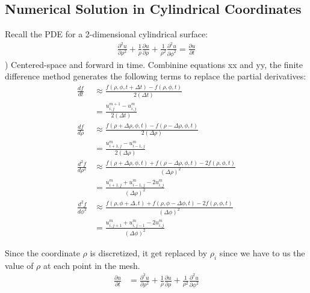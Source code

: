 \documentclass[11pt]{article}
\begin{document}
    \hypertarget{numerical-solution-in-cylindrical-coordinates}{%
\subsection{Numerical Solution in Cylindrical
Coordinates}\label{numerical-solution-in-cylindrical-coordinates}}

    Recall the PDE for a 2-dimensional cylindrical surface: \begin{equation}
\begin{split}
\frac {\partial^2 u}{\partial \rho^2} + \frac{1}{\rho} \frac {\partial u}{\partial \rho} + 
\frac{1}{\rho^2} \frac {\partial^2 u}{\partial \phi^2} = \frac {\partial u}{\partial t}
\end{split}
\end{equation}) Centered-space and forward in time. Combinine equations
xx and yy, the finite difference method generates the following terms to
replace the partial derivatives: \begin{equation}
\begin{split} 
\frac{df}{dt} &\approx \frac{f(\rho, \phi, t + \Delta t) - f(\rho, \phi, t)}{2 (\Delta t)} \\
&= \frac{u_{i,j}^{m + 1} - u_{i,j}^{m}}{2 (\Delta t)} \\
\frac{df}{d\rho} &\approx \frac{f(\rho +\Delta \rho, \phi, t) - f(\rho - \Delta \rho, \phi, t )}{2 (\Delta \rho)} \\
&= \frac{u_{i + 1,j}^{m} - u_{i -1 ,j}^{m}}{2 (\Delta \rho)} \\
\frac{d^2f}{d\rho^2} &\approx \frac{f(\rho + \Delta \rho, \phi, t) + f(\rho - \Delta \rho, \phi, t) - 2 f(\rho, \phi, t)}{(\Delta \rho)^2} \\
&= \frac{u_{i + 1 ,j}^m + u_{i - 1 ,j}^m - 2 u_{i,j}^m}{(\Delta \rho)^2} \\
\frac{d^2f}{d\phi^2} &\approx \frac{f(\rho, \phi + \Delta, t) + f(\rho, \phi - \Delta \phi, t) - 2 f(\rho, \phi, t)}{(\Delta \phi)^2} \\
&= \frac{u_{i,j + 1}^m + u_{i,j - 1}^m - 2 u_{i,j}^m}{(\Delta \phi)^2}  
\end{split} 
\end{equation}

Since the coordinate \(\rho\) is discretized, it get replaced by
\(\rho_i\) since we have to us the value of \(\rho\) at each point in
the mesh. \begin{equation}
\begin{split}
\frac {\partial u}{\partial t} &= \frac {\partial^2 u}{\partial \rho^2} + \frac{1}{\rho} \frac {\partial u}{\partial \rho} + 
\frac{1}{\rho^2} \frac {\partial^2 u}{\partial \phi^2} 
\end{split}
\end{equation}
\end{document}
